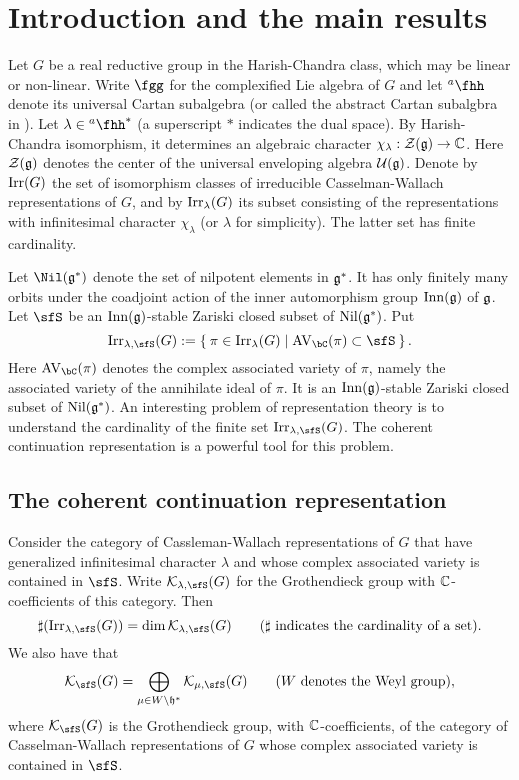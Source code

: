 \documentclass[counting_main.tex]{subfiles}
\begin{document}
\section{Introduction and the main results}

Let $G$ be a real reductive group in the Harish-Chandra class, which may be
linear or non-linear. Write $\fgg$ for the complexified Lie algebra of $G$ and
let $\hha$ denote its universal Cartan subalgebra (or called the abstract Cartan subalgbra in \cite{V4}). Let $\lambda \in \hha^*$ (a
superscript $*$ indicates the dual space). By Harish-Chandra isomorphism, it
determines an algebraic character $\chi_\lambda: {\mathcal {Z}}(\mathfrak g)\rightarrow \mathbb{C}$. Here
${\mathcal {Z}}(\mathfrak g)$ denotes the center of the universal enveloping algebra
$\mathcal U(\mathfrak g)$. Denote by $\mathrm{Irr}(G)$ the set of isomorphism classes of
irreducible Casselman-Wallach representations of $G$, and by $\mathrm{Irr}_\lambda(G)$
its subset consisting of the representations with infinitesimal character
$\chi_\lambda$ (or $\lambda$ for simplicity). The latter set has finite cardinality.


Let $\Nil(\g^*)$ denote the set of nilpotent elements in $\mathfrak g^*$. It has only
finitely many orbits under the coadjoint action of the inner automorphism group
$\mathrm{Inn}(\mathfrak g)$ of $\mathfrak g$. Let $\sfS$ be an $\mathrm{Inn}(\mathfrak g)$-stable Zariski
closed subset of $\mathrm{Nil}(\mathfrak g^*)$. Put
\[
  \Irr_{\lambda,\sfS}(G):=\Set{\pi \in \Irr_{\lambda}(G)| \text{$\AVC(\pi)\subset \sfS$} }.
\]
Here $\AVC(\pi)$ denotes the complex associated variety of $\pi$, namely the
associated variety of the annihilate ideal of $\pi$. It is an
$\mathrm{Inn}(\mathfrak g)$-stable Zariski closed subset of $\mathrm{Nil}(\mathfrak g^*)$. An
interesting problem of representation theory is to understand the cardinality of
the finite set $\Irr_{\lambda,\sfS}(G)$. The coherent continuation
representation is a powerful tool for this problem.

\subsection{The coherent continuation representation}


Consider the category of Cassleman-Wallach representations of $G$ that have
generalized infinitesimal character $\lambda$ and whose complex associated
variety is contained in $\sfS$. Write $\CK_{\lambda,\sfS}(G)$ for the
Grothendieck group with $\mathbb{C}$-coefficients of this category. Then
\[
  \sharp (\Irr_{\lambda,\sfS}(G))=\dim \CK_{\lambda,\sfS}(G)\qquad(\sharp\textrm{
    indicates the cardinality of a set}).
\]
We also have that
\[
  \CK_\sfS(G)=\bigoplus_{\mu\in W\backslash \h^*} \CK_{\mu,\sfS}(G)\qquad (W\textrm{
    denotes the Weyl group}),
\]
where $\CK_{\sfS}(G)$ is the Grothendieck group, with $\mathbb{C}$-coefficients, of the
category of Casselman-Wallach representations of $G$ whose complex associated
variety is contained in $\sfS$.
\end{document}
